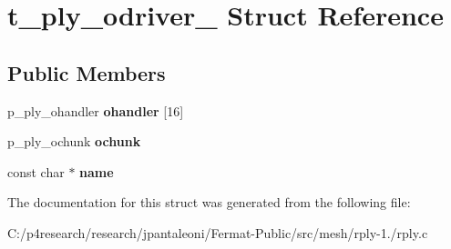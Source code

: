 \hypertarget{structt__ply__odriver__}{}\section{t\+\_\+ply\+\_\+odriver\+\_\+ Struct Reference}
\label{structt__ply__odriver__}
\subsection*{Public Members}
\begin{DoxyCompactItemize}
\item 
\mbox{\label{structt__ply__odriver___a8e73dd635a21a1be2de07c7ead55fb44}} 
p\+\_\+ply\+\_\+ohandler {\bfseries ohandler} \mbox{[}16\mbox{]}
\item 
\mbox{\label{structt__ply__odriver___a02635ba242394795d3716793cd1c3c87}} 
p\+\_\+ply\+\_\+ochunk {\bfseries ochunk}
\item 
\mbox{\label{structt__ply__odriver___a510d75a4c2aa06c9266de2554636f600}} 
const char $\ast$ {\bfseries name}
\end{DoxyCompactItemize}


The documentation for this struct was generated from the following file\+:\begin{DoxyCompactItemize}
\item 
C\+:/p4research/research/jpantaleoni/\+Fermat-\/\+Public/src/mesh/rply-\/1./rply.\+c\end{DoxyCompactItemize}
